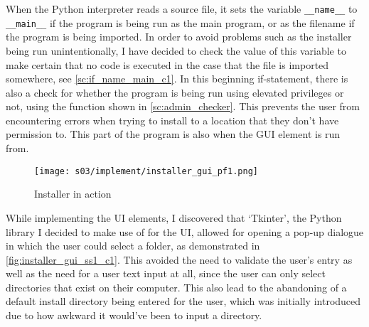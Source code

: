 

    When the Python interpreter reads a source file, it sets the variable \verb|__name__| to \verb|__main__| if the program is being run as the main program, or as the filename if the program is being imported.
    In order to avoid problems such as the installer being run unintentionally, I have decided to check the value of this variable to make certain that no code is executed in the case that the file is imported somewhere, see \autoref{sc:if_name_main_c1}.
    In this beginning if-statement, there is also a check for whether the program is being run using elevated privileges or not, using the function shown in \autoref{sc:admin_checker}. 
    This prevents the user from encountering errors when trying to install to a location that they don't have permission to.
    This part of the program is also when the GUI element is run from.


    \begin{figure}[!ht]
        \centering
        \texttt{[image: s03/implement/installer\_gui\_pf1.png]}
        \caption{Installer in action}
        \label{fig:installer_gui_ss1_c1}
    \end{figure}


    While implementing the UI elements, I discovered that `Tkinter', the Python library I decided to make use of for the UI, allowed for opening a pop-up dialogue in which the user could select a folder, as demonstrated in \autoref{fig:installer_gui_ss1_c1}.
    This avoided the need to validate the user's entry as well as the need for a user text input at all, since the user can only select directories that exist on their computer. 
    This also lead to the abandoning of a default install directory being entered for the user, which was initially introduced due to how awkward it would've been to input a directory.

